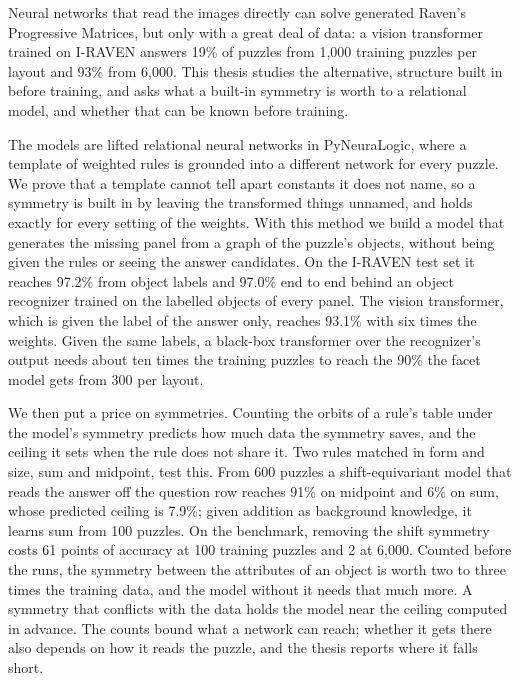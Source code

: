 Neural networks that read the images directly can solve generated Raven's Progressive Matrices, but only with a great deal of data: a vision transformer trained on I-RAVEN answers 19\% of puzzles from 1,000 training puzzles per layout and 93\% from 6,000. This thesis studies the alternative, structure built in before training, and asks what a built-in symmetry is worth to a relational model, and whether that can be known before training.

The models are lifted relational neural networks in PyNeuraLogic, where a template of weighted rules is grounded into a different network for every puzzle. We prove that a template cannot tell apart constants it does not name, so a symmetry is built in by leaving the transformed things unnamed, and holds exactly for every setting of the weights. With this method we build a model that generates the missing panel from a graph of the puzzle's objects, without being given the rules or seeing the answer candidates. On the I-RAVEN test set it reaches 97.2\% from object labels and 97.0\% end to end behind an object recognizer trained on the labelled objects of every panel. The vision transformer, which is given the label of the answer only, reaches 93.1\% with six times the weights. Given the same labels, a black-box transformer over the recognizer's output needs about ten times the training puzzles to reach the 90\% the facet model gets from 300 per layout.

We then put a price on symmetries. Counting the orbits of a rule's table under the model's symmetry predicts how much data the symmetry saves, and the ceiling it sets when the rule does not share it. Two rules matched in form and size, sum and midpoint, test this. From 600 puzzles a shift-equivariant model that reads the answer off the question row reaches 91\% on midpoint and 6\% on sum, whose predicted ceiling is 7.9\%; given addition as background knowledge, it learns sum from 100 puzzles. On the benchmark, removing the shift symmetry costs 61 points of accuracy at 100 training puzzles and 2 at 6,000. Counted before the runs, the symmetry between the attributes of an object is worth two to three times the training data, and the model without it needs that much more. A symmetry that conflicts with the data holds the model near the ceiling computed in advance. The counts bound what a network can reach; whether it gets there also depends on how it reads the puzzle, and the thesis reports where it falls short.
